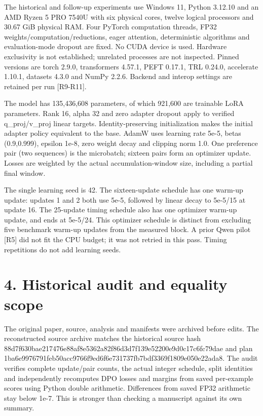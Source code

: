 \documentclass[10pt]{article}
\begin{document}
The historical and follow-up experiments use Windows 11, Python 3.12.10 and an AMD Ryzen 5 PRO 7540U with six physical cores, twelve logical processors and 30.67 GiB physical RAM. Four PyTorch computation threads, FP32 weights/computation/reductions, eager attention, deterministic algorithms and evaluation-mode dropout are fixed. No CUDA device is used. Hardware exclusivity is not established; unrelated processes are not inspected. Pinned versions are torch 2.9.0, transformers 4.57.1, PEFT 0.17.1, TRL 0.24.0, accelerate 1.10.1, datasets 4.3.0 and NumPy 2.2.6. Backend and interop settings are retained per run [R9-R11].


The model has 135,436,608 parameters, of which 921,600 are trainable LoRA parameters. Rank 16, alpha 32 and zero adapter dropout apply to verified q\_proj/v\_proj linear targets. Identity-preserving initialization makes the initial adapter policy equivalent to the base. AdamW uses learning rate 5e-5, betas (0.9,0.999), epsilon 1e-8, zero weight decay and clipping norm 1.0. One preference pair (two sequences) is the microbatch; sixteen pairs form an optimizer update. Losses are weighted by the actual accumulation-window size, including a partial final window.


The single learning seed is 42. The sixteen-update schedule has one warm-up update: updates 1 and 2 both use 5e-5, followed by linear decay to 5e-5/15 at update 16. The 25-update timing schedule also has one optimizer warm-up update, and ends at 5e-5/24. This optimizer schedule is distinct from excluding five benchmark warm-up updates from the measured block. A prior Qwen pilot [R5] did not fit the CPU budget; it was not retried in this pass. Timing repetitions do not add learning seeds.


\section*{4. Historical audit and equality scope}

The original paper, source, analysis and manifests were archived before edits. The reconstructed source archive matches the historical source hash 88d7f630bae217476e88af8e5362a82f86d3d7f139e52200e9d0c17c6fc79dae and plan 1ba6e9976791feb50acc9766f9ed6f6e731737fb7bdf3369f1809e050e22ada8. The audit verifies complete update/pair counts, the actual integer schedule, split identities and independently recomputes DPO losses and margins from saved per-example scores using Python double arithmetic. Differences from saved FP32 arithmetic stay below 1e-7. This is stronger than checking a manuscript against its own summary.
\end{document}
